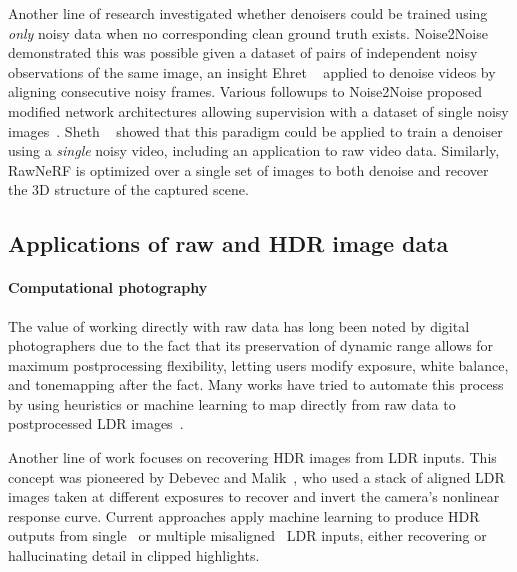 Another line of research investigated whether denoisers could be trained using \emph{only} noisy data when no corresponding clean ground truth exists. Noise2Noise~\cite{lehtinen2018} demonstrated this was possible given a dataset of pairs of independent noisy observations of the same image, an insight Ehret \etal~\cite{ehret2019f2f} applied to denoise videos by aligning consecutive noisy frames.
Various followups to Noise2Noise proposed modified network architectures allowing supervision with a dataset of single noisy images~\cite{krull2019noise2void,batson2019noise2self,laine2019blindspot}. 
Sheth \etal~\cite{udvd} showed that this paradigm could be applied to train a denoiser using a \emph{single} noisy video, including an application to raw video data. Similarly, RawNeRF is optimized over a single set of images to both denoise and recover the 3D structure of the captured scene.







\subsection{Applications of raw and HDR image data}

\paragraph{Computational photography}
The value of working directly with raw data has long been noted by digital photographers due to the fact that its preservation of dynamic range allows for maximum postprocessing flexibility, letting users modify exposure, white balance, and tonemapping after the fact. Many works have tried to automate this process by using heuristics or machine learning to map directly from raw data to postprocessed LDR images~\cite{mit5k,chen2018cvpr,hdrnet,hu2018whitebox}. 

Another line of work focuses on recovering HDR images from LDR inputs. This concept was pioneered by Debevec and Malik~\cite{debevec1997}, who used a stack of aligned LDR images taken at different exposures to recover and invert the camera's nonlinear response curve. 
Current approaches apply machine learning to produce HDR outputs from single~\cite{ldr2hdrcnn} or multiple misaligned~\cite{kalantari2017hdr} LDR inputs, either recovering or hallucinating detail in clipped highlights.

